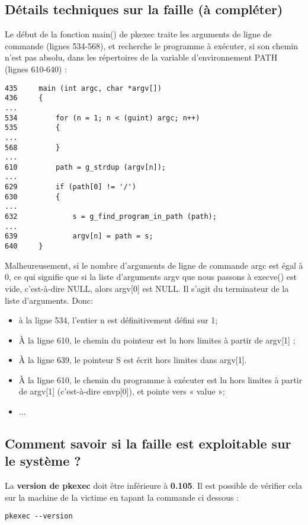 \documentclass[a4paper, 12pt]{article}
\begin{document}
   		\subsection{Détails techniques sur la faille (à compléter) }
   		\begin{flushleft}
   			\noindent Le début de la fonction main() de pkexec traite les arguments de ligne de commande (lignes 534-568), et recherche le programme à exécuter, si son chemin n’est pas absolu, dans les répertoires de la variable d'environnement PATH (lignes 610-640) :
   			\begin{lstlisting}
435 	main (int argc, char *argv[])
436 	{
...
534 		for (n = 1; n < (guint) argc; n++)
535     	{
...
568     	}
...
610   		path = g_strdup (argv[n]);
...
629   		if (path[0] != '/')
630     	{
...
632     		s = g_find_program_in_path (path);
...
639       		argv[n] = path = s;
640     }
        	\end{lstlisting}
        	\item Malheureusement, si le nombre d’arguments de ligne de commande argc est égal à 0, ce qui signifie que si la liste d’arguments argv que nous passons à execve() est vide, c’est-à-dire {NULL}, alors argv[0] est NULL. Il s’agit du terminateur de la liste d’arguments. Donc:
        	\begin{itemize}
        		\item à la ligne 534, l’entier n est définitivement défini sur 1;
        		\item À la ligne 610, le chemin du pointeur est lu hors limites à partir de argv[1] ;
        		\item À la ligne 639, le pointeur S est écrit hors limites dans argv[1].
        		\item À la ligne 610, le chemin du programme à exécuter est lu hors limites à partir de argv[1] (c’est-à-dire envp[0]), et pointe vers « value »;
        		\item ...
        	\end{itemize}
        	
   		\end{flushleft}
   		\subsection{Comment savoir si la faille est exploitable sur le système ?}
   		La \textbf{version de pkexec} doit être inférieure à \textbf{0.105}. Il est possible de vérifier cela sur la machine de la victime en tapant la commande ci dessous : 
\begin{lstlisting}
pkexec --version
\end{lstlisting}
\end{document}
